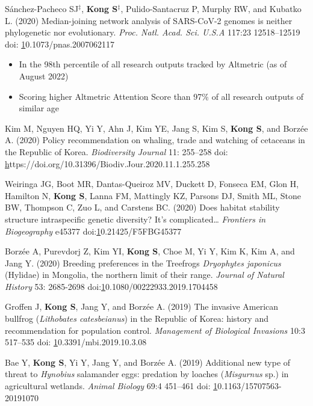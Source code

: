 \documentclass[11pt]{article}
\begin{document}
\begin{etaremune}
\item  Sánchez-Pacheco SJ{$^\ddag$}, \textbf{Kong S}{$^\ddag$}, Pulido-Santacruz P, Murphy RW, and Kubatko L. (2020) Median-joining network analysis of SARS-CoV-2 genomes is neither phylogenetic nor evolutionary. \textit{Proc. Natl. Acad. Sci. U.S.A} 117:23 12518–12519 doi: \href{https://doi.org/10.1073/pnas.2007062117}10.1073/pnas.2007062117
	
	\begin{itemize}\item In the 98th percentile of all research outputs tracked by Altmetric (as of August 2022)
				\item Scoring higher Altmetric Attention Score than 97\% of all research outputs of similar age \end{itemize}
	
\item Kim M, Nguyen HQ, Yi Y, Ahn J, Kim YE, Jang S, Kim S, \textbf{Kong S}, and Borzée A. (2020) Policy recommendation on whaling, trade and watching of cetaceans in the Republic of Korea. \textit{Biodiversity Journal} 11: 255–258 doi: \href{https://doi.org/10.31396/Biodiv.Jour.2020.11.1.255.258}https://doi.org/10.31396/Biodiv.Jour.2020.11.1.255.258
\item Weiringa JG, Boot MR,  Dantas-Queiroz MV, Duckett D, Fonseca EM, Glon H, Hamilton N, \textbf{Kong S}, Lanna FM, Mattingly KZ, Parsons DJ, Smith ML, Stone BW, Thompson C, Zuo L, and Carstens BC. (2020) Does habitat stability structure intraspecific genetic diversity? It’s complicated… \textit{Frontiers in Biogeography} e45377 doi:\href{https://doi.org/10.21425/F5FBG45377}10.21425/F5FBG45377
\item Borzée A, Purevdorj Z, Kim YI, \textbf{Kong S}, Choe M, Yi Y, Kim K, Kim A, and Jang Y. (2020) Breeding preferences in the Treefrogs \textit{Dryophytes japonicus} (Hylidae) in Mongolia, the northern limit of their range. \textit{Journal of Natural History} 53: 2685-2698 doi:\href{10.1080/00222933.2019.1704458}10.1080/00222933.2019.1704458
\item Groffen J, \textbf{Kong S}, Jang Y, and Borzée A. (2019) The invasive American bullfrog (\textit{Lithobates catesbeianus}) in the Republic of Korea: history and recommendation for population control. \textit{Management of Biological Invasions} 10:3 517–535 doi: \href{10.3391/mbi.2019.10.3.08}10.3391/mbi.2019.10.3.08
\item Bae Y, \textbf{Kong S}, Yi Y, Jang Y, and Borzée A. (2019) Additional new type of threat to \textit{Hynobius} salamander eggs: predation by loaches (\textit{Misgurnus} sp.) in agricultural wetlands. \textit{Animal Biology} 69:4 451–461 doi: \href{https://doi.org/10.1163/15707563-20191070}10.1163/15707563-20191070

\end{etaremune}
\end{document}
